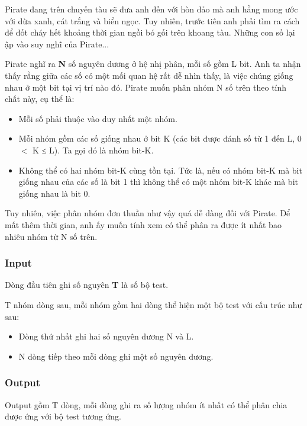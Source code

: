 



   Pirate đang trên chuyến tàu sẽ đưa anh đến với hòn đảo mà anh hằng mong ước với dừa xanh, cát trắng và biển ngọc. Tuy nhiên, trước tiên anh phải tìm ra cách để đốt cháy hết khoảng thời gian ngồi bó gối trên khoang tàu. Những con số lại ập vào suy nghĩ của Pirate...  

   Pirate nghĩ ra   \textbf{    N   }   số nguyên dương ở hệ nhị phân, mỗi số gồm L bit. Anh ta nhận thấy rằng giữa các số có một mối quan hệ rất dễ nhìn thấy, là việc chúng giống nhau ở một bit tại vị trí nào đó. Pirate muốn phân nhóm N số trên theo tính chất này, cụ thể là:  
\begin{itemize}
	\item     Mỗi số phải thuộc vào duy nhất một nhóm.   
	\item     Mỗi nhóm gồm các số giống nhau ở bit K (các bit được đánh số từ 1 đến L, 0 $<$ K ≤ L). Ta gọi đó là nhóm bit-K.   
	\item     Không thể có hai nhóm bit-K cùng tồn tại. Tức là, nếu có nhóm bit-K mà bit giống nhau của các số là bit 1 thì không thể có một nhóm bit-K khác mà bit giống nhau là bit 0.   
\end{itemize}

   Tuy nhiên, việc phân nhóm đơn thuần như vậy quá dễ dàng đối với Pirate. Để mất thêm thời gian, anh ấy muốn tính xem có thể phân ra được ít nhất bao nhiêu nhóm từ N số trên.  

\subsubsection{   Input  }

   Dòng đầu tiên ghi số nguyên   \textbf{    T   }   là số bộ test.  

   T nhóm dòng sau, mỗi nhóm gồm hai dòng thể hiện một bộ test với cấu trúc như sau:   
\begin{itemize}
	\item     Dòng thứ nhất ghi hai số nguyên dương N và L.   
	\item     N dòng tiếp theo mỗi dòng ghi một số nguyên dương.   
\end{itemize}

\subsubsection{   Output  }

   Output gồm T dòng, mỗi dòng ghi ra số lượng nhóm ít nhất có thể phân chia được ứng với bộ test tương ứng.  

